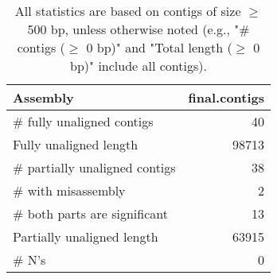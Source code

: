 \documentclass[12pt,a4paper]{article}
\begin{document}
\begin{table}[ht]
\begin{center}
\caption{All statistics are based on contigs of size $\geq$ 500 bp, unless otherwise noted (e.g., "\# contigs ($\geq$ 0 bp)" and "Total length ($\geq$ 0 bp)" include all contigs).}
\begin{tabular}{|l*{1}{|r}|}
\hline
Assembly & final.contigs \\ \hline
\# fully unaligned contigs & 40 \\ \hline
Fully unaligned length & 98713 \\ \hline
\# partially unaligned contigs & 38 \\ \hline
\hspace{5mm}\# with misassembly & 2 \\ \hline
\hspace{5mm}\# both parts are significant & 13 \\ \hline
Partially unaligned length & 63915 \\ \hline
\# N's & 0 \\ \hline
\end{tabular}
\end{center}
\end{table}
\end{document}
